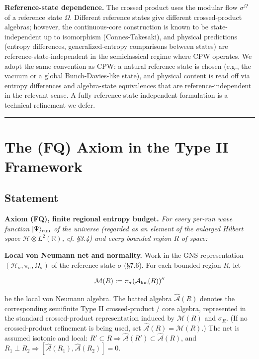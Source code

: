 \documentclass[11pt,a4paper]{article}
\begin{document}
\textbf{Reference-state dependence.} The crossed product uses the modular flow $\sigma^\Omega$ of a reference state $\Omega$. Different reference states give different crossed-product algebras; however, the continuous-core construction is known to be state-independent up to isomorphism (Connes-Takesaki), and physical predictions (entropy differences, generalized-entropy comparisons between states) are reference-state-independent in the semiclassical regime where CPW operates. We adopt the same convention as CPW: a natural reference state is chosen (e.g., the vacuum or a global Bunch-Davies-like state), and physical content is read off via entropy differences and algebra-state equivalences that are reference-independent in the relevant sense. A fully reference-state-independent formulation is a technical refinement we defer.

\medskip\hrule\medskip

\section{The (FQ) Axiom in the Type II Framework}

\subsection{Statement}

\textbf{Axiom (FQ), finite regional entropy budget.} \emph{For every per-run wave function $|\Psi\rangle_{\rm run}$ of the universe (regarded as an element of the enlarged Hilbert space $\mathcal{H} \otimes L^2(\mathbb{R})$, cf. §3.4) and every bounded region $R$ of space:}

\textbf{Local von Neumann net and normality.} Work in the GNS representation $(\mathcal{H}_\sigma, \pi_\sigma, \Omega_\sigma)$ of the reference state $\sigma$ (§7.6). For each bounded region $R$, let

\[
\mathcal{M}(R) := \pi_\sigma(\mathcal{A}_{\rm loc}(R))''
\]

be the local von Neumann algebra. The hatted algebra $\hat{\mathcal{A}}(R)$ denotes the corresponding semifinite Type II crossed-product / core algebra, represented in the standard crossed-product representation induced by $\mathcal{M}(R)$ and $\sigma_R$. (If no crossed-product refinement is being used, set $\hat{\mathcal{A}}(R) = \mathcal{M}(R)$.) The net is assumed isotonic and local: $R' \subset R \Rightarrow \hat{\mathcal{A}}(R') \subset \hat{\mathcal{A}}(R)$, and $R_1 \perp R_2 \Rightarrow [\hat{\mathcal{A}}(R_1), \hat{\mathcal{A}}(R_2)] = 0$.
\end{document}
